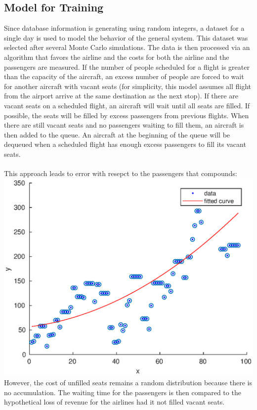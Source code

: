 \documentclass[12pt]{article}
\begin{document}
\subsection{Model for Training}
Since database information is generating using random integers, a dataset for a single day is used to model the behavior of the general system. This dataset was selected after several Monte Carlo simulations. The data is then processed via an algorithm that favors the airline and the costs for both the airline and the passengers are measured. If the number of people scheduled for a flight is greater than the capacity of the aircraft, an excess number of people are forced to wait for another aircraft with vacant seats (for simplicity, this model assumes all flight from the airport arrive at the same destination as the next stop). If there are vacant seats on a scheduled flight, an aircraft will wait until all seats are filled. If possible, the seats will be filled by excess passengers from previous flights. When there are still vacant seats and no passengers waiting to fill them, an aircraft is then added to the queue. An aircraft at the beginning of the queue will be dequeued when a scheduled flight has enough excess passengers to fill its vacant seats. \\
\\
This approach leads to error with resepct to the passengers that compounds: \\
\includegraphics{poly2.eps}
\\
However, the cost of unfilled seats remains a random distribution because there is no accumulation. The waiting time for the passengers is then compared to the hypothetical loss of revenue for the airlines had it not filled vacant seats. \\
\end{document}
